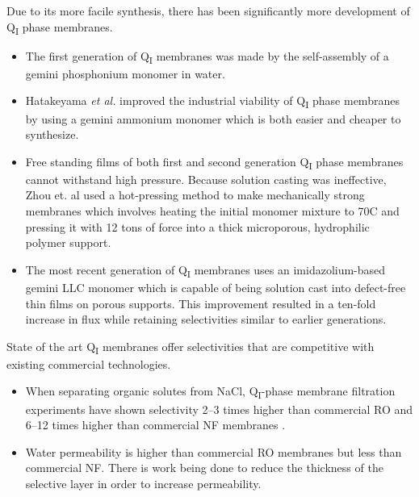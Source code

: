  Due to its more facile synthesis, there has been significantly more development
  of Q\textsubscript{I} phase membranes.
  \begin{itemize}
    \item The first generation of Q\textsubscript{I} membranes was made by 
    the self-assembly of a gemini phosphonium monomer in water.~\cite{pindzola_cross-linked_2003}
    \item Hatakeyama \textit{et al.} improved the industrial viability of Q\textsubscript{I} 
    phase membranes by using a gemini ammonium monomer which is both easier and cheaper
    to synthesize.~\cite{hatakeyama_nanoporous_2010}
    \item Free standing films of both first and second generation Q\textsubscript{I} phase 
    membranes cannot withstand high pressure. Because solution casting was ineffective, Zhou
    et. al used a hot-pressing method to make mechanically strong membranes which involves 
    heating the initial monomer mixture to 70\degree C and pressing it with 12 tons of force
    into a thick microporous, hydrophilic polymer support.~\cite{zhou_new_2007}
    \item The most recent generation of Q\textsubscript{I} membranes uses an imidazolium-based
    gemini LLC monomer which is capable of being solution cast into defect-free thin films on
    porous supports. This improvement resulted in a ten-fold increase in flux while retaining
    selectivities similar to earlier generations.~\cite{carter_glycerol-based_2012}
  \end{itemize}
  
  
  State of the art Q\textsubscript{I} membranes offer selectivities that
  are competitive with existing commercial technologies.
  \begin{itemize}
    \item When separating organic solutes from NaCl, Q\textsubscript{I}-phase
    membrane filtration experiments have shown selectivity 2--3 times higher than
    commercial RO and 6--12 times higher than commercial NF membranes
    \cite{dischinger_application_2017}.
    \item Water permeability is higher than commercial RO membranes but
    less than commercial NF. There is work being done to reduce the
    thickness of the selective layer in order to increase permeability. 
  \end{itemize}

